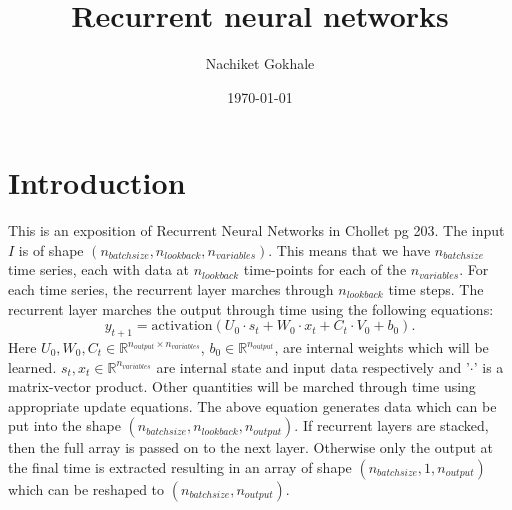 \documentclass{article}
\newcommand{\beq}{\begin{equation}}
\newcommand{\eeq}{\end{equation}}
\begin{document}
\title{Recurrent neural networks}
\author{Nachiket Gokhale}
\date{\today}
\maketitle
\section{Introduction}
This is an exposition of Recurrent Neural Networks in Chollet pg 203. The input $I$ is of shape $(n_{batchsize},n_{lookback},n_{variables})$. This means that we have $n_{batchsize}$ time series, each with data at $n_{lookback}$ time-points for each of the $n_{variables}$. For each time series, the recurrent layer marches through $n_{lookback}$ time steps. The recurrent layer marches the output through time using the following equations:
\beq
y_{t+1} = \text{activation}(U_0\cdot{s_t} + W_0\cdot{x_t} + C_t\cdot{V_0} + b_{0}).
\eeq
Here $U_0,W_0,C_t \in \mathbb{R}^{n_{output}\times{n_{variables}}}$, $b_0 \in \mathbb{R}^{n_{output}}$, are internal weights which will be learned. $s_{t},x_{t} \in \mathbb{R}^{n_{variables}}$ are internal state and input data respectively and '$\cdot$' is a matrix-vector product. Other quantities will be marched through time using appropriate update equations. The above equation generates data which can be put into the shape $(n_{batchsize},n_{lookback},n_{output})$. If recurrent layers are stacked, then the full array is passed on to the next layer. Otherwise only the output at the final time is extracted resulting in an array of shape $(n_{batchsize},1,n_{output})$ which can be reshaped to $(n_{batchsize},n_{output})$.
\end{document}
